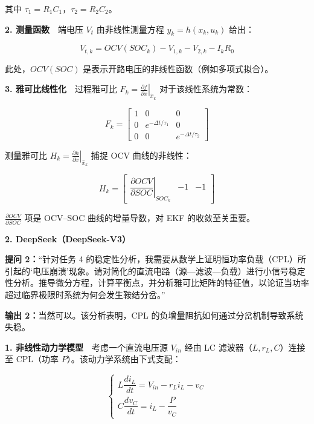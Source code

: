 \documentclass[11pt,a4paper]{ctexart}
\begin{document}
其中 $\tau_1 = R_1C_1$，$\tau_2 = R_2C_2$。

\noindent\textbf{2. 测量函数}　端电压 $V_t$ 由非线性测量方程 $y_k = h(x_k, u_k)$ 给出：

\begin{equation*}
V_{t,k} = OCV(SOC_k) - V_{1,k} - V_{2,k} - I_k R_0
\end{equation*}

此处，$OCV(SOC)$ 是表示开路电压的非线性函数（例如多项式拟合）。

\noindent\textbf{3. 雅可比线性化}　过程雅可比 $F_k = \left.\frac{\partial f}{\partial x}\right|_{\hat{x}_k}$ 对于该线性系统为常数：

\begin{equation*}
F_k =
\begin{bmatrix}
1 & 0 & 0 \\
0 & e^{-\Delta t/\tau_1} & 0 \\
0 & 0 & e^{-\Delta t/\tau_2}
\end{bmatrix}
\end{equation*}

测量雅可比 $H_k = \left.\frac{\partial h}{\partial x}\right|_{\hat{x}_k}$ 捕捉 OCV 曲线的非线性：

\begin{equation*}
H_k =
\begin{bmatrix}
\left.\dfrac{\partial OCV}{\partial SOC}\right|_{SOC_k} & -1 & -1
\end{bmatrix}
\end{equation*}

$\frac{\partial OCV}{\partial SOC}$ 项是 OCV--SOC 曲线的增量导数，对 EKF 的收敛至关重要。

\noindent\textbf{2. DeepSeek（DeepSeek-V3）}

\noindent\textbf{提问 2：}“针对任务 4 的稳定性分析，我需要从数学上证明恒功率负载（CPL）所引起的‘电压崩溃’现象。请对简化的直流电路（源—滤波—负载）进行小信号稳定性分析。推导微分方程，计算平衡点，并分析雅可比矩阵的特征值，以论证当功率超过临界极限时系统为何会发生鞍结分岔。”

\noindent\textbf{输出 2：}当然可以。该分析表明，CPL 的负增量阻抗如何通过分岔机制导致系统失稳。

\noindent\textbf{1. 非线性动力学模型}　考虑一个直流电压源 $V_{in}$ 经由 LC 滤波器（$L, r_L, C$）连接至 CPL（功率 $P$）。该动力学系统由下式支配：

\begin{equation*}
\begin{cases}
L\dfrac{di_L}{dt} = V_{in} - r_L i_L - v_C \\[8pt]
C\dfrac{dv_C}{dt} = i_L - \dfrac{P}{v_C}
\end{cases}
\end{equation*}
\end{document}
